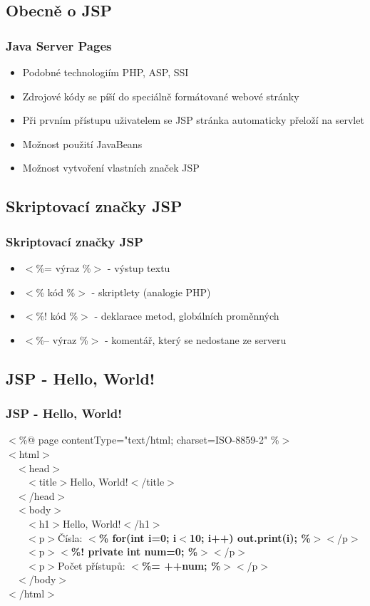 \documentclass{beamer}
\begin{document}
\subsection{Obecně o JSP}

\begin{frame}
  \frametitle{Java Server Pages}
    \begin{itemize}
      \item Podobné technologiím PHP, ASP, SSI
      \item Zdrojové kódy se píší do speciálně formátované webové stránky
      \item Při prvním přístupu uživatelem se JSP stránka automaticky přeloží na servlet
      \item Možnost použití JavaBeans
      \item Možnost vytvoření vlastních značek JSP
    \end{itemize}
\end{frame}


\subsection{Skriptovací značky JSP}

\begin{frame}
  \frametitle{Skriptovací značky JSP}
    \begin{itemize}
      \item $<$\%= výraz \%$>$ - výstup textu
      \item $<$\% kód \%$>$ - skriptlety (analogie PHP)
      \item $<$\%! kód \%$>$ - deklarace metod, globálních proměnných
      \item $<$\%-- výraz \%$>$ - komentář, který se nedostane ze serveru
    \end{itemize}
\end{frame}


\subsection*{JSP - Hello, World!}

\begin{frame}
  \frametitle{JSP - Hello, World!}
$<$\%@ page contentType="text/html; charset=ISO-8859-2" \%$>$\\
$<$html$>$\\
\ \ $<$head$>$\\
\ \ \ \ $<$title$>$Hello, World!$<$/title$>$\\
\ \ $<$/head$>$\\
\ \ $<$body$>$\\
\ \ \ \ $<$h1$>$Hello, World!$<$/h1$>$\\
\ \ \ \ $<$p$>$Čísla: {\bf $<$\% for(int i=0; i$<$10; i++) out.print(i); \%$>$}$<$/p$>$\\
\ \ \ \ $<$p$>${\bf $<$\%! private int num=0; \%$>$}$<$/p$>$\\
\ \ \ \ $<$p$>$Počet přístupů: {\bf $<$\%= ++num; \%$>$}$<$/p$>$\\
\ \ $<$/body$>$\\
$<$/html$>$
\end{frame}
\end{document}
